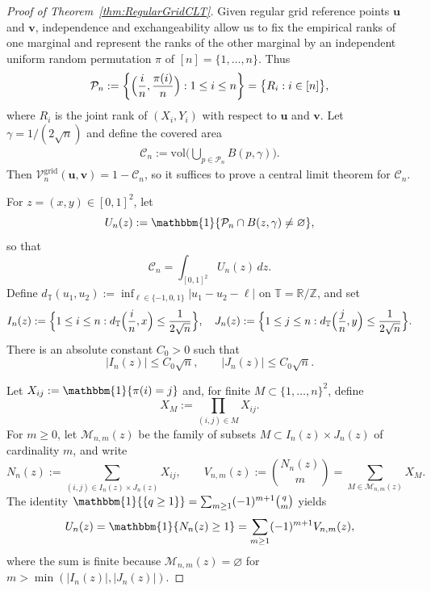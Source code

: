 \documentclass[11pt]{article}
\newcommand{\cM}{\mathcal{M}}
\newcommand{\bone}{\mathbbm{1}}
\newcommand{\cp}{\mathcal{P}}
\newcommand{\bs}[1]{\boldsymbol{#1}}
\begin{document}
\begin{proof}[Proof of Theorem~\ref{thm:RegularGridCLT}]
Given regular grid reference points $\bs{u}$ and $\bs v$, independence and exchangeability allow us to fix the empirical ranks of one marginal and represent the ranks of the other marginal by an independent uniform random permutation $\pi$ of $[n]=\{1,\dots,n\}$. Thus
\[
\cp_n:=\biggl\{\Bigl(\frac{i}{n},\frac{\pi(i)}{n}\Bigr):1\le i\le n\biggr\} = \bigl\{R_i: i\in[n]\bigr\},
\]
where $R_i$ is the joint rank of $(X_i,Y_i)$ with respect to $\bs u$ and $\bs v$. Let $\gamma=1/(2\sqrt n)$ and define the covered area
\begin{align}
\label{Eq:DefnCn}
\mathscr{C}_n := \mathrm{vol}\biggl(\bigcup_{p \in \cp_n} B(p, \gamma)\biggr).
\end{align}
Then $\mathcal{V}_n^{\mathrm{grid}}(\bs{u},\bs{v})=1-\mathscr{C}_n$, so it suffices to prove a central limit theorem for $\mathscr{C}_n$.

For $z=(x,y)\in[0,1]^2$, let
\[
U_n(z):=\bone\{\cp_n\cap B(z,\gamma)\neq\varnothing\},
\]
so that
\begin{equation}\label{eq:Anintegral}
\mathscr{C}_n=\int_{[0,1]^2}U_n(z)\,dz.
\end{equation}
Define $d_{\mathbb{T}}(u_1,u_2):=\inf_{\ell\in\{-1,0,1\}}|u_1-u_2-\ell|$ on $\mathbb{T}=\mathbb{R}/\mathbb{Z}$, and set
\[
I_n(z) := \Bigl\{1\le i\le n: d_{\mathbb{T}}\Bigl(\frac{i}{n},x\Bigr) \leq \frac{1}{2\sqrt{n}} \Bigr\}, \quad
J_n(z) := \Bigl\{1\le j\le n: d_{\mathbb{T}}\Bigl(\frac{j}{n},y\Bigr) \leq \frac{1}{2\sqrt{n}} \Bigr\}.
\]
There is an absolute constant $C_0>0$ such that
\begin{equation}\label{eq:IJsize}
|I_n(z)|\le C_0\sqrt n,\qquad |J_n(z)|\le C_0\sqrt n.
\end{equation}

Let $X_{ij}:=\bone\{\pi(i)=j\}$ and, for finite $M\subset\{1,\dots,n\}^2$, define
\[
X_M:=\prod_{(i,j)\in M}X_{ij}.
\]
For $m\ge0$, let $\cM_{n,m}(z)$ be the family of subsets $M\subset I_n(z)\times J_n(z)$ of cardinality $m$, and write
\[
N_n(z):=\sum_{(i,j)\in I_n(z)\times J_n(z)}X_{ij},\qquad
V_{n,m}(z):=\binom{N_n(z)}{m}=\sum_{M\in\cM_{n,m}(z)}X_M.
\]
The identity $\bone{\{q\ge1\}}=\sum_{m\ge1}(-1)^{m+1}\binom{q}{m}$ yields
\begin{equation}\label{eq:Uexpand}
U_n(z)=\bone\{N_n(z)\ge1\}=\sum_{m\ge1}(-1)^{m+1}V_{n,m}(z),
\end{equation}
where the sum is finite because $\cM_{n,m}(z)=\varnothing$ for $m>\min(|I_n(z)|,|J_n(z)|)$.


\end{proof}
\end{document}
